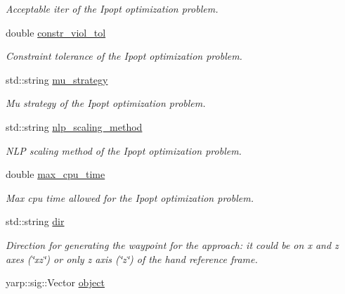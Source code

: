 \begin{DoxyCompactItemize}
\begin{DoxyCompactList}\small\item\em Acceptable iter of the Ipopt optimization problem. \end{DoxyCompactList}\item 
double \hyperlink{classGraspingModule_a5529bf668b7ea95582ea238d5f50e3c2}{constr\+\_\+viol\+\_\+tol}\label{classGraspingModule_a5529bf668b7ea95582ea238d5f50e3c2}

\begin{DoxyCompactList}\small\item\em Constraint tolerance of the Ipopt optimization problem. \end{DoxyCompactList}\item 
std\+::string \hyperlink{classGraspingModule_a64763408867f3cb6dc508c91f8cf220a}{mu\+\_\+strategy}\label{classGraspingModule_a64763408867f3cb6dc508c91f8cf220a}

\begin{DoxyCompactList}\small\item\em Mu strategy of the Ipopt optimization problem. \end{DoxyCompactList}\item 
std\+::string \hyperlink{classGraspingModule_aecc5738f9012849c9edaf35f479723b4}{nlp\+\_\+scaling\+\_\+method}\label{classGraspingModule_aecc5738f9012849c9edaf35f479723b4}

\begin{DoxyCompactList}\small\item\em N\+LP scaling method of the Ipopt optimization problem. \end{DoxyCompactList}\item 
double \hyperlink{classGraspingModule_a3dabf2eac967efb30b1b7bb9c91e41b3}{max\+\_\+cpu\+\_\+time}\label{classGraspingModule_a3dabf2eac967efb30b1b7bb9c91e41b3}

\begin{DoxyCompactList}\small\item\em Max cpu time allowed for the Ipopt optimization problem. \end{DoxyCompactList}\item 
std\+::string \hyperlink{classGraspingModule_a87c885eada6df4d622c92173d8a4ed2e}{dir}
\begin{DoxyCompactList}\small\item\em Direction for generating the waypoint for the approach\+: it could be on x and z axes (\char`\"{}xz\char`\"{}) or only z axis (\char`\"{}z\char`\"{}) of the hand reference frame. \end{DoxyCompactList}\item 
yarp\+::sig\+::\+Vector \hyperlink{classGraspingModule_a4b3ada8a9325ed821e73b8e84375c4fa}{object}\label{classGraspingModule_a4b3ada8a9325ed821e73b8e84375c4fa}


\end{DoxyCompactItemize}
